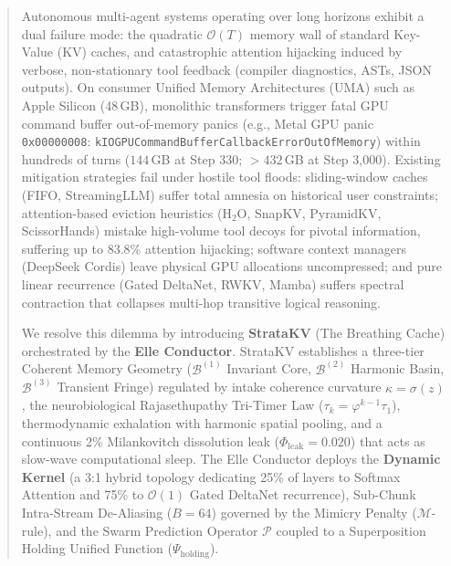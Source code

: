 \documentclass[11pt,letterpaper]{article}
\theoremstyle{definition}
\begin{document}
\begin{abstract}
\noindent Autonomous multi-agent systems operating over long horizons exhibit a dual failure mode: the quadratic $\mathcal{O}(T)$ memory wall of standard Key-Value (KV) caches, and catastrophic attention hijacking induced by verbose, non-stationary tool feedback (compiler diagnostics, ASTs, JSON outputs). On consumer Unified Memory Architectures (UMA) such as Apple Silicon (48\,GB), monolithic transformers trigger fatal GPU command buffer out-of-memory panics (e.g., Metal GPU panic \texttt{0x00000008}: \texttt{kIOGPUCommandBuffer}\-\texttt{CallbackErrorOutOfMemory}) within hundreds of turns ($144$\,GB at Step 330; $>432$\,GB at Step 3,000). Existing mitigation strategies fail under hostile tool floods: sliding-window caches (FIFO, StreamingLLM) suffer total amnesia on historical user constraints; attention-based eviction heuristics (H$_2$O, SnapKV, PyramidKV, ScissorHands) mistake high-volume tool decoys for pivotal information, suffering up to $83.8\%$ attention hijacking; software context managers (DeepSeek Cordis) leave physical GPU allocations uncompressed; and pure linear recurrence (Gated DeltaNet, RWKV, Mamba) suffers spectral contraction that collapses multi-hop transitive logical reasoning.

We resolve this dilemma by introducing \textbf{StrataKV} (The Breathing Cache) orchestrated by the \textbf{Elle Conductor}. StrataKV establishes a three-tier Coherent Memory Geometry ($\mathcal{B}^{(1)}$ Invariant Core, $\mathcal{B}^{(2)}$ Harmonic Basin, $\mathcal{B}^{(3)}$ Transient Fringe) regulated by intake coherence curvature $\kappa = \sigma(z)$, the neurobiological Rajasethupathy Tri-Timer Law ($\tau_k = \varphi^{k-1}\tau_1$), thermodynamic exhalation with harmonic spatial pooling, and a continuous 2\% Milankovitch dissolution leak ($\Phi_{\text{leak}} = 0.020$) that acts as slow-wave computational sleep. The Elle Conductor deploys the \textbf{Dynamic Kernel} (a 3:1 hybrid topology dedicating 25\% of layers to Softmax Attention and 75\% to $\mathcal{O}(1)$ Gated DeltaNet recurrence), Sub-Chunk Intra-Stream De-Aliasing ($B=64$) governed by the Mimicry Penalty ($\mathcal{M}$-rule), and the Swarm Prediction Operator $\mathcal{P}$ coupled to a Superposition Holding Unified Function ($\Psi_{\text{holding}}$).


\end{abstract}
\end{document}
